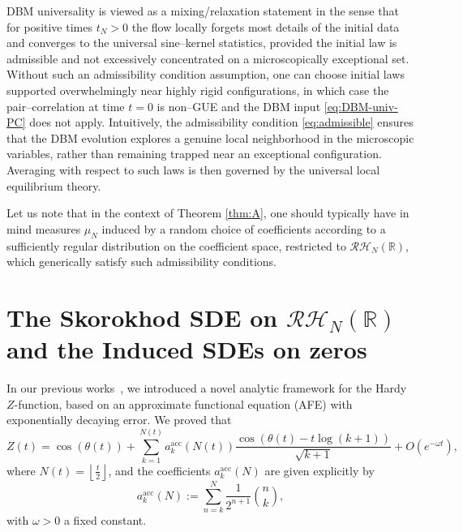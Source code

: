 \documentclass[12pt,reqno]{amsart}
\theoremstyle{plain}
\theoremstyle{definition}
\theoremstyle{remark}
\begin{document}
DBM universality is viewed as a mixing/relaxation statement in the sense that for positive times $t_N>0$ the flow
locally forgets most details of the initial data and converges to the universal
sine--kernel statistics, provided the initial law is admissible and not excessively concentrated on a
microscopically exceptional set. Without such an admissibility condition assumption, one can choose initial laws supported overwhelmingly near highly rigid
configurations, in which case the pair--correlation at time
$t=0$ is non--GUE and the DBM input \eqref{eq:DBM-univ-PC} does not apply.
Intuitively, the admissibility condition \eqref{eq:admissible} ensures that the DBM evolution explores a genuine local
neighborhood in the microscopic variables, rather than remaining trapped near an
exceptional configuration. Averaging with respect to such laws is then governed by the universal local equilibrium theory.

Let us note that in the context of Theorem \ref{thm:A}, one should typically have in mind measures $\mu_N$ induced by a random choice of coefficients according to a sufficiently regular distribution on the coefficient space, restricted to $\mathcal{RH}_N(\mathbb{R})$, which generically satisfy such admissibility conditions.

\section{The Skorokhod SDE on $\mathcal{RH}_N (\mathbb{R})$ and the Induced SDEs on zeros}
\label{s:4} 

In our previous works~\cite{J,J4,J5,J3}, we introduced a novel analytic framework for the Hardy \( Z \)-function, based on an approximate functional equation (AFE) with exponentially decaying error. We proved that
\begin{equation} 
\label{eq:acc}
Z(t) = \cos(\theta(t)) + \sum_{k=1}^{N(t)} a^{\mathrm{acc}}_{k}(N(t)) \frac{\cos( \theta(t)- t \log(k+1) )}{\sqrt{k+1}} + O \left( e^{- \omega t} \right),
\end{equation} 
where \( N(t) = \left\lfloor \frac{t}{2} \right\rfloor \), and the coefficients \( a^{\mathrm{acc}}_k(N) \) are given explicitly by
\begin{equation}
\label{eq:acc-co}
a^{\mathrm{acc}}_{k}(N) := \sum_{n=k}^{N} \frac{1}{2^{n+1}} \binom{n}{k},
\end{equation}  
with \( \omega > 0 \) a fixed constant.
\end{document}
